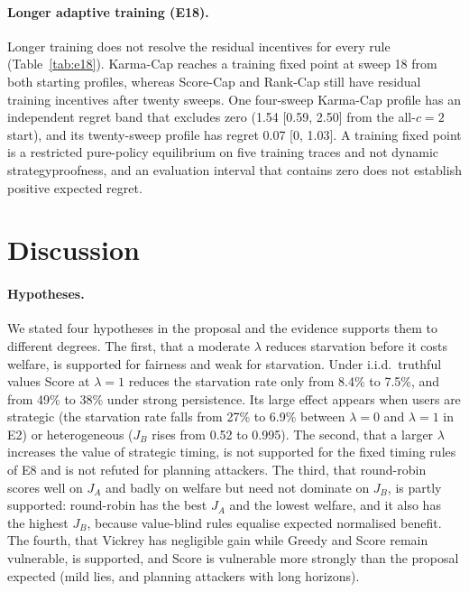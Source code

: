 \documentclass{article}
\theoremstyle{plain}
\theoremstyle{definition}
\newcommand{\JA}{J_A}
\newcommand{\JB}{J_B}
\begin{document}


\paragraph{Longer adaptive training (E18).}
Longer training does not resolve the residual incentives for every rule (Table~\ref{tab:e18}).
Karma-Cap reaches a training fixed point at sweep 18 from both starting profiles, whereas Score-Cap and Rank-Cap still have residual training incentives after twenty sweeps.
One four-sweep Karma-Cap profile has an independent regret band that excludes zero (1.54 [0.59, 2.50] from the all-$c{=}2$ start), and its twenty-sweep profile has regret 0.07 [0, 1.03].
A training fixed point is a restricted pure-policy equilibrium on five training traces and not dynamic strategyproofness, and an evaluation interval that contains zero does not establish positive expected regret.



\section{Discussion}
\label{sec:discussion}

\paragraph{Hypotheses.}
We stated four hypotheses in the proposal and the evidence supports them to different degrees.
The first, that a moderate $\lambda$ reduces starvation before it costs welfare, is supported for fairness and weak for starvation.
Under i.i.d.\ truthful values Score at $\lambda=1$ reduces the starvation rate only from 8.4\% to 7.5\%, and from 49\% to 38\% under strong persistence.
Its large effect appears when users are strategic (the starvation rate falls from 27\% to 6.9\% between $\lambda=0$ and $\lambda=1$ in E2) or heterogeneous ($\JB$ rises from 0.52 to 0.995).
The second, that a larger $\lambda$ increases the value of strategic timing, is not supported for the fixed timing rules of E8 and is not refuted for planning attackers.
The third, that round-robin scores well on $\JA$ and badly on welfare but need not dominate on $\JB$, is partly supported: round-robin has the best $\JA$ and the lowest welfare, and it also has the highest $\JB$, because value-blind rules equalise expected normalised benefit.
The fourth, that Vickrey has negligible gain while Greedy and Score remain vulnerable, is supported, and Score is vulnerable more strongly than the proposal expected (mild lies, and planning attackers with long horizons).
\end{document}
